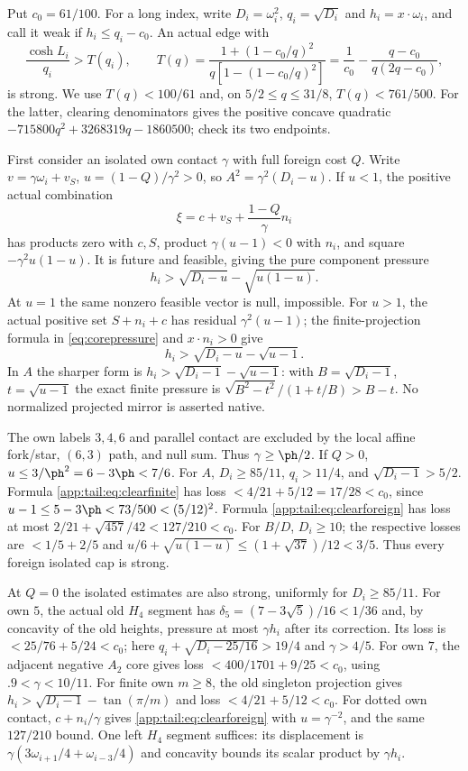 Put $c_0=61/100$. For a long index, write $D_i=\omega_i^2$,
$q_i=\sqrt{D_i}$ and $h_i=x\cdot\omega_i$, and call it weak if
$h_i\le q_i-c_0$. An actual edge with
\[
 \frac{\cosh L_i}{q_i}>T(q_i),\qquad
 T(q)=\frac{1+(1-c_0/q)^2}{q[1-(1-c_0/q)^2]}
      =\frac1{c_0}-\frac{q-c_0}{q(2q-c_0)},
\]
is strong. We use $T(q)<100/61$ and, on $5/2\le q\le31/8$,
$T(q)<761/500$. For the latter, clearing denominators gives the
positive concave quadratic
$-715800q^2+3268319q-1860500$; check its two endpoints.

First consider an isolated own contact $\gamma$ with full foreign
cost $Q$. Write $v=\gamma\omega_i+v_S$,
$u=(1-Q)/\gamma^2>0$, so $A^2=\gamma^2(D_i-u)$.
If $u<1$, the positive actual combination
\[
 \xi=c+v_S+\frac{1-Q}{\gamma}n_i
\]
has products zero with $c,S$, product $\gamma(u-1)<0$ with $n_i$,
and square $-\gamma^2u(1-u)$. It is future and feasible, giving
the pure component pressure
\begin{equation}\label{app:tail:eq:clearforeign}
 h_i>\sqrt{D_i-u}-\sqrt{u(1-u)}.
\end{equation}
At $u=1$ the same nonzero feasible vector is null, impossible.
For $u>1$, the actual positive set $S+n_i+c$ has residual
$\gamma^2(u-1)$; the finite-projection formula in \eqref{eq:corepressure} and $x\cdot n_i>0$ give
\begin{equation}\label{app:tail:eq:clearfinite}
 h_i>\sqrt{D_i-u}-\sqrt{u-1}.
\end{equation}
In $A$ the sharper form is $h_i>\sqrt{D_i-1}-\sqrt{u-1}$:
with $B=\sqrt{D_i-1}$, $t=\sqrt{u-1}$ the exact finite pressure
is $\sqrt{B^2-t^2}/(1+t/B)>B-t$.
No normalized projected mirror is asserted native.

The own labels $3,4,6$ and parallel contact are excluded by the
local affine fork/star, $(6,3)$ path, and null sum. Thus
$\gamma\ge\ph/2$. If $Q>0$, $u\le3/\ph^2=6-3\ph<7/6$.
For $A$, $D_i\ge85/11$, $q_i>11/4$, and
$\sqrt{D_i-1}>5/2$. Formula \eqref{app:tail:eq:clearfinite} has loss
$<4/21+5/12=17/28<c_0$, since
$u-1\le5-3\ph<73/500<(5/12)^2$.
Formula \eqref{app:tail:eq:clearforeign} has loss at most
$2/21+\sqrt{457}/42<127/210<c_0$.
For $B/D$, $D_i\ge10$; the respective losses are
$<1/5+2/5$ and
$u/6+\sqrt{u(1-u)}\le(1+\sqrt{37})/12<3/5$.
Thus every foreign isolated cap is strong.

At $Q=0$ the isolated estimates are also strong, uniformly for
$D_i\ge85/11$. For own $5$, the actual old $H_4$ segment has
$\delta_5=(7-3\sqrt5)/16<1/36$ and, by concavity of the old
heights, pressure at most $\gamma h_i$ after its correction.
Its loss is $<25/76+5/24<c_0$; here
$q_i+\sqrt{D_i-25/16}>19/4$ and $\gamma>4/5$.
For own $7$, the adjacent negative $A_2$ core gives loss
$<400/1701+9/25<c_0$, using $.9<\gamma<10/11$.
For finite own $m\ge8$, the old singleton projection gives
$h_i>\sqrt{D_i-1}-\tan(\pi/m)$ and loss
$<4/21+5/12<c_0$.
For dotted own contact, $c+n_i/\gamma$ gives
\eqref{app:tail:eq:clearforeign} with $u=\gamma^{-2}$, and the same
$127/210$ bound. One left $H_4$ segment suffices: its displacement
is $\gamma(3\omega_{i+1}/4+\omega_{i-3}/4)$ and concavity
bounds its scalar product by $\gamma h_i$.

